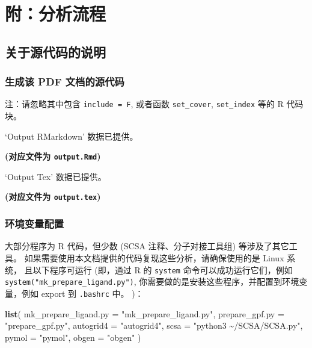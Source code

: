 \documentclass[
]{article}
\newenvironment{Shaded}{\begin{snugshade}}{\end{snugshade}}
\newcommand{\DataTypeTok}[1]{\textcolor[rgb]{0.13,0.29,0.53}{#1}}
\newcommand{\KeywordTok}[1]{\textcolor[rgb]{0.13,0.29,0.53}{\textbf{#1}}}
\newcommand{\NormalTok}[1]{#1}
\newcommand{\StringTok}[1]{\textcolor[rgb]{0.31,0.60,0.02}{#1}}
\begin{document}
\hypertarget{workflow}{%
\section{附：分析流程}\label{workflow}}

\hypertarget{code}{%
\subsection{关于源代码的说明}\label{code}}

\hypertarget{ux751fux6210ux8be5-pdf-ux6587ux6863ux7684ux6e90ux4ee3ux7801}{%
\subsubsection{生成该 PDF 文档的源代码}\label{ux751fux6210ux8be5-pdf-ux6587ux6863ux7684ux6e90ux4ee3ux7801}}

注：请忽略其中包含 \texttt{include\ =\ F}, 或者函数 \texttt{set\_cover}, \texttt{set\_index} 等的 R 代码块。

`Output RMarkdown' 数据已提供。

\textbf{(对应文件为 \texttt{output.Rmd})}

`Output Tex' 数据已提供。

\textbf{(对应文件为 \texttt{output.tex})}

\hypertarget{ux73afux5883ux53d8ux91cfux914dux7f6e}{%
\subsubsection{环境变量配置}\label{ux73afux5883ux53d8ux91cfux914dux7f6e}}

大部分程序为 R 代码，但少数 (SCSA 注释、分子对接工具组) 等涉及了其它工具。
如果需要使用本文档提供的代码复现这些分析，请确保使用的是 Linux 系统，
且以下程序可运行
(即，通过 R 的 \texttt{system} 命令可以成功运行它们，例如 \texttt{system("mk\_prepare\_ligand.py")},
你需要做的是安装这些程序，并配置到环境变量，例如 export 到 \texttt{.bashrc} 中。
)：

\begin{Shaded}
\begin{Highlighting}[]
\KeywordTok{list}\NormalTok{(}
  \DataTypeTok{mk\_prepare\_ligand.py =} \StringTok{"mk\_prepare\_ligand.py"}\NormalTok{,}
  \DataTypeTok{prepare\_gpf.py =} \StringTok{"prepare\_gpf.py"}\NormalTok{,}
  \DataTypeTok{autogrid4 =} \StringTok{"autogrid4"}\NormalTok{,}
  \DataTypeTok{scsa =} \StringTok{"python3 \textasciitilde{}/SCSA/SCSA.py"}\NormalTok{,}
  \DataTypeTok{pymol =} \StringTok{"pymol"}\NormalTok{,}
  \DataTypeTok{obgen =} \StringTok{"obgen"}
\NormalTok{)}
\end{Highlighting}
\end{Shaded}
\end{document}
